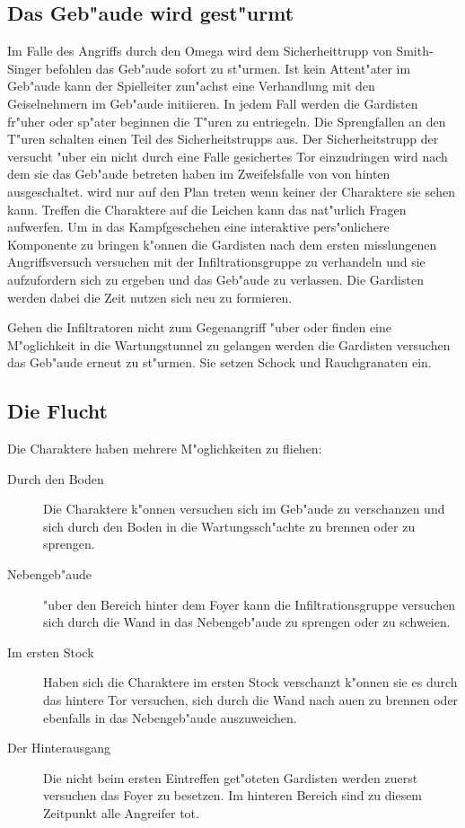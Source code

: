 \subsection{Das Geb"aude wird gest"urmt} 
Im Falle des Angriffs durch den Omega wird dem Sicherheittrupp von Smith-Singer befohlen das Geb"aude sofort zu st"urmen. Ist kein Attent"ater im Geb"aude kann der Spielleiter zun"achst eine Verhandlung mit den Geiselnehmern im Geb"aude initiieren. In jedem Fall werden die Gardisten fr"uher oder sp"ater beginnen die T"uren zu entriegeln. Die Sprengfallen an den T"uren schalten einen Teil des Sicherheitstrupps aus. Der Sicherheitstrupp der versucht "uber ein nicht durch eine Falle gesichertes Tor einzudringen wird nach dem sie das Geb"aude betreten haben im Zweifelsfalle von \xl{} von hinten ausgeschaltet. \xl{} wird nur auf den Plan treten wenn keiner der Charaktere sie sehen kann. Treffen die Charaktere auf die Leichen kann das nat"urlich Fragen aufwerfen. Um in das Kampfgeschehen eine interaktive pers"onlichere Komponente zu bringen k"onnen die Gardisten nach dem ersten misslungenen Angriffsversuch versuchen mit der Infiltrationsgruppe zu verhandeln und sie aufzufordern sich zu ergeben und das Geb"aude zu verlassen. Die Gardisten werden dabei die Zeit nutzen sich neu zu formieren.

Gehen die Infiltratoren nicht zum Gegenangriff "uber oder finden eine M"oglichkeit in die Wartungstunnel zu gelangen werden die Gardisten versuchen das Geb"aude erneut zu st"urmen. Sie setzen Schock und Rauchgranaten ein.

\subsection{Die Flucht} 
Die Charaktere haben mehrere M"oglichkeiten zu fliehen:

\begin{description}
	\item [Durch den Boden] Die Charaktere k"onnen versuchen sich im Geb"aude zu verschanzen und sich durch den Boden in die 		
		Wartungssch"achte zu brennen oder zu sprengen.
	\item [Nebengeb"aude] "uber den Bereich hinter dem Foyer kann die Infiltrationsgruppe versuchen sich durch die Wand in das 		
		Nebengeb"aude zu sprengen oder zu schwei\3en.
	\item [Im ersten Stock] Haben sich die Charaktere im ersten Stock verschanzt k"onnen sie es durch das hintere Tor versuchen, 
		  sich 	durch die Wand nach au\3en zu brennen oder ebenfalls in das Nebengeb"aude auszuweichen.
	\item [Der Hinterausgang] Die nicht beim ersten Eintreffen get"oteten Gardisten werden zuerst versuchen das Foyer zu besetzen. Im hinteren Bereich sind zu diesem Zeitpunkt alle Angreifer tot.	
\end{description}

